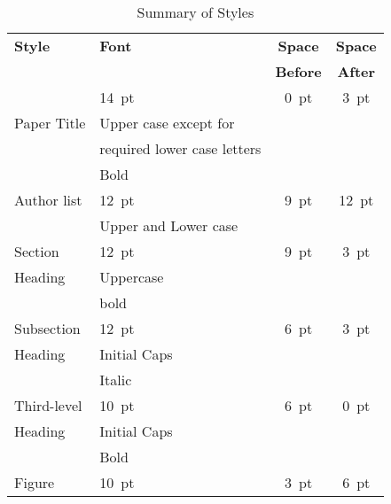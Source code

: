 \documentclass[a4paper,
              ]{jacow}
\begin{document}
\begin{table}[h!t]
    \setlength\tabcolsep{3.8pt}
    \caption{Summary of Styles}
    \label{style-tab}
    \begin{tabular}{@{}llcc@{}}
        \textbf{Style} & \textbf{Font}               & \textbf{Space}  & \textbf{Space} \\
                       &                             & \textbf{Before} & \textbf{After} \\
        \midrule
                       & \SI{14}{pt}                 & \SI{0}{pt}      & \SI{3}{pt}  \\
          Paper Title  & Upper case except for       &                 &      \\
                       & required lower case letters &                 &      \\   %
                       & Bold                        &                 &      \\
         \midrule
          Author list  & \SI{12}{pt}                 & \SI{9}{pt}      & \SI{12}{pt} \\
                       & Upper and Lower case        &                 &      \\
         \midrule
         Section       & \SI{12}{pt}                 & \SI{9}{pt}      & \SI{3}{pt}  \\
         Heading       & Uppercase                   &                 &      \\
                       & bold                        &                 &      \\
        \midrule	
         Subsection    & \SI{12}{pt}                 & \SI{6}{pt}      & \SI{3}{pt}  \\
         Heading       & Initial Caps                &                 &      \\
                       & Italic                      &                 &      \\
        \midrule
         Third-level   & \SI{10}{pt}                 & \SI{6}{pt}           & \SI{0}{pt}  \\
         Heading       & Initial Caps                &                 &      \\
                       & Bold                        &                 &      \\
        \midrule
         Figure        & \SI{10}{pt}                 & \SI{3}{pt}           & \SI{6}{pt}  \\

\end{tabular}
\end{table}
\end{document}
